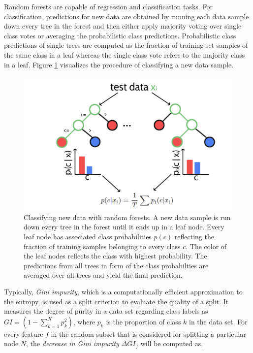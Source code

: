 \documentclass[12pt,a4paper,twoside]{book}
\theoremstyle{definition}
\theoremstyle{definition}
\theoremstyle{remark}
\begin{document}
Random forests are capable of regression and classification tasks. For
classification, predictions for new data are obtained by running each
data sample down every tree in the forest and then either apply majority
voting over single class votes or averaging the probabilistic class
predictions. Probabilistic class predictions of single trees are
computed as the fraction of training set samples of the same class in a
leaf whereas the single class vote refers to the majority class in a
leaf. Figure \ref{fig:rf-intro} visualizes the procedure of classifying
a new data sample.









\begin{figure}

{\centering \includegraphics[width=0.8\linewidth]{img/random_forest_contact_prior/intro_random_forest} 

}

\caption{Classifying new data with random forests. A new
data sample is run down every tree in the forest until it ends up in a
leaf node. Every leaf node has associated class probabilities \(p(c)\)
reflecting the fraction of training samples belonging to every class
\(c\). The color of the leaf nodes reflects the class with highest
probability. The predictions from all trees in form of the class
probabilties are averaged over all trees and yield the final prediction.}\label{fig:rf-intro}
\end{figure}

Typically, \emph{Gini impurity}, which is a computationally efficient
approximation to the entropy, is used as a split criterion to evaluate
the quality of a split. It measures the degree of purity in a data set
regarding class labels as \(GI = (1 - \sum_{k=1}^K p_k^2)\), where
\(p_k\) is the proportion of class \(k\) in the data set. For every
feature \(f\) in the random subset that is considered for splitting a
particular node \(N\), the \emph{decrease in Gini impurity}
\(\Delta GI_f\) will be computed as,
\end{document}
